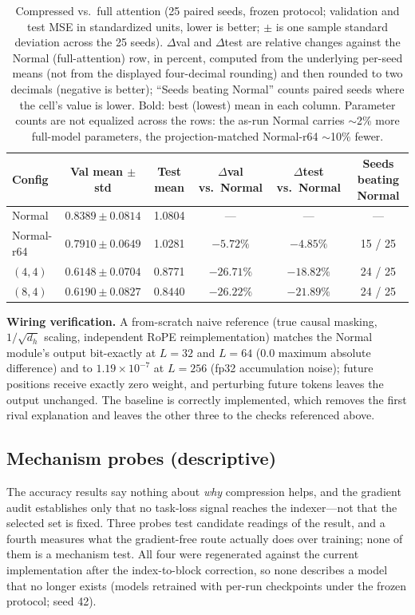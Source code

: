 \begin{table}[t]
\centering
\small
\caption{Compressed vs.\ full attention (25 paired seeds, frozen protocol;
validation and test MSE in standardized units, lower is better; $\pm$ is one
sample standard deviation across the 25 seeds).
$\Delta$val and $\Delta$test are relative changes against the Normal
(full-attention) row, in percent, computed from the underlying per-seed means
(not from the displayed four-decimal rounding) and then rounded to two
decimals (negative is better); ``Seeds beating Normal'' counts paired seeds where
the cell's value is lower. Bold: best (lowest) mean in each column.
Parameter counts are not
equalized across the rows: the as-run Normal carries $\sim$2\% more full-model
parameters, the projection-matched Normal-r64 $\sim$10\% fewer.}
\label{tab:baseline}
\begin{tabular}{lccccc}
\toprule
Config & Val mean $\pm$ std & Test mean & $\Delta$val vs.\ Normal & $\Delta$test vs.\ Normal & Seeds beating Normal \\
\midrule
Normal & $0.8389 \pm 0.0814$ & 1.0804 & --- & --- & --- \\
Normal-r64 & $0.7910 \pm 0.0649$ & 1.0281 & $-5.72\%$ & $-4.85\%$ & 15 / 25 \\
$(4,4)$ & $\mathbf{0.6148} \pm 0.0704$ & 0.8771 & $-26.71\%$ & $-18.82\%$ & 24 / 25 \\
$(8,4)$ & $0.6190 \pm 0.0827$ & $\mathbf{0.8440}$ & $-26.22\%$ & $-21.89\%$ & 24 / 25 \\
\bottomrule
\end{tabular}
\end{table}

\textbf{Wiring verification.} A from-scratch naive reference (true causal
masking, $1/\sqrt{d_h}$ scaling, independent RoPE reimplementation) matches the
Normal module's output bit-exactly at $L{=}32$ and $L{=}64$ ($0.0$ maximum
absolute difference) and to $1.19 \times 10^{-7}$ at $L{=}256$ (fp32
accumulation noise); future positions receive exactly zero weight, and
perturbing future tokens leaves the output unchanged. The baseline is correctly
implemented, which removes the first rival explanation and leaves the other
three to the checks referenced above.

\subsection{Mechanism probes (descriptive)}
\label{sec:probes}

The accuracy results say nothing about \emph{why} compression helps, and the
gradient audit establishes only that no task-loss signal reaches the
indexer---not that the selected set is fixed. Three probes test candidate
readings of the result, and a fourth measures what the gradient-free route
actually does over training; none of them is a mechanism test. All four were
regenerated against the current implementation after the index-to-block
correction, so none describes a model that no longer exists (models retrained
with per-run checkpoints under the frozen protocol; seed 42).


